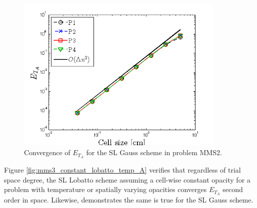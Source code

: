 %
%
\begin{figure}[!hbp]
\centering
\includegraphics[width=10cm]{chapter6_grey_radtran/Dissertation_Data/MMS3_Constant_XS_SL_Gauss_temp_A.png}
\caption{Convergence of $E_{T_A}$ for the SL Gauss scheme in problem MMS2.}
\label{fig:mms3_constant_gauss_temp_A}
\end{figure}
Figure \ref{fig:mms3_constant_lobatto_temp_A} verifies that regardless of trial space degree, the SL Lobatto scheme assuming a cell-wise constant opacity for a problem with temperature or spatially varying opacities converges $E_{T_A}$ second order in space.
Likewise,  demonstrates the same is true for the SL Gauss scheme.

\pagebreak

